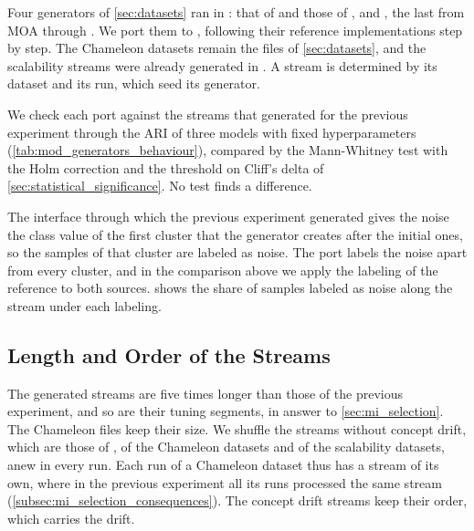 Four generators of \cref{sec:datasets} ran in : that of \Cassini and those of \BenchmarkOne, \BenchmarkTwo and \RandomRBFGeneratorEvents, the last from MOA \cite{bifet2010moa} through  \cite{streamMOA2024}. We port them to , following their reference implementations step by step. The Chameleon datasets remain the files of \cref{sec:datasets}, and the scalability streams were already generated in . A stream is determined by its dataset and its run, which seed its generator.

We check each port against the streams that  generated for the previous experiment through the ARI of three models with fixed hyperparameters (\cref{tab:mod_generators_behaviour}), compared by the Mann-Whitney test with the Holm correction and the threshold on Cliff's delta of \cref{sec:statistical_significance}. No test finds a difference.



The interface through which the previous experiment generated \RandomRBFGeneratorEvents gives the noise the class value of the first cluster that the generator creates after the initial ones, so the samples of that cluster are labeled as noise. The port labels the noise apart from every cluster, and in the comparison above we apply the labeling of the reference to both sources.  shows the share of samples labeled as noise along the stream under each labeling.



\subsection{Length and Order of the Streams}
\label{subsec:mod_streams}

The generated streams are five times longer than those of the previous experiment, and so are their tuning segments, in answer to \cref{sec:mi_selection}. The Chameleon files keep their size. We shuffle the streams without concept drift, which are those of \Cassini, of the Chameleon datasets and of the scalability datasets, anew in every run. Each run of a Chameleon dataset thus has a stream of its own, where in the previous experiment all its runs processed the same stream (\cref{subsec:mi_selection_consequences}). The concept drift streams keep their order, which carries the drift.


